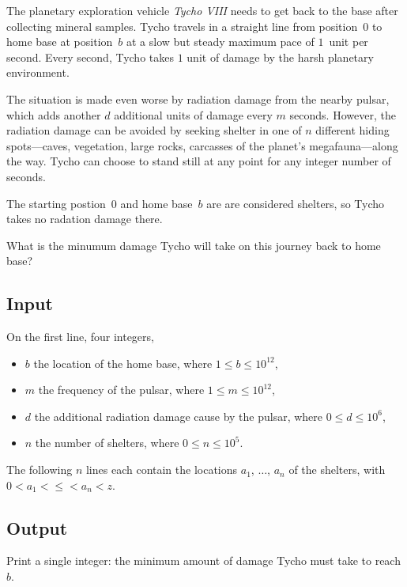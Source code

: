 
The planetary exploration vehicle \emph{Tycho VIII} needs to get back to the base after collecting mineral samples.
Tycho travels in a straight line from position~$0$ to home base at position~$b$ at a slow but steady maximum pace of $1$~unit per second.
Every second, Tycho takes $1$ unit of damage by the harsh planetary environment.

The situation is made even worse by radiation damage from the nearby pulsar, which adds another $d$ additional units of damage every $m$ seconds.
However, the radiation damage can be avoided by seeking shelter in one of $n$ different hiding spots---caves, vegetation, large rocks, carcasses of the planet's megafauna---along the way.
Tycho can choose to stand still at any point for any integer number of seconds.

The starting postion~$0$ and home base~$b$ are are considered shelters, so Tycho takes no radation damage there.

\medskip
What is the minumum damage Tycho will take on this journey back to home base?

\subsection*{Input}

On the first line, four integers, 
\begin{itemize} 
\item $b$ the location of the home base, where $1\leq b \leq 10^{12}$,
\item $m$ the frequency of the pulsar, where $1\leq m \leq 10^{12}$,
\item $d$ the additional radiation damage cause by the pulsar, where $0\leq d\leq 10^6$,
\item $n$ the number of shelters, where $0\leq n\leq 10^5$.
\end{itemize}
The following $n$ lines each contain the locations $a_1$, $\ldots$, $a_n$ of the shelters, with $0<a_1< \leq < a_n < z$.

\subsection*{Output}

Print a single integer: the minimum amount of damage Tycho must take to reach $b$.
